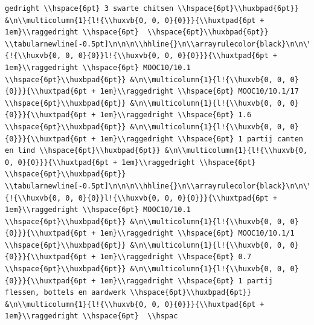 \documentclass[11pt,preprint, authoryear]{elsarticle}
\numberwithin{equation}{section}
\numberwithin{figure}{section}
\numberwithin{table}{section}
\begin{document}
\begin{verbatim}
gedright \\hspace{6pt} 3 swarte chitsen \\hspace{6pt}\\huxbpad{6pt}} &\n\\multicolumn{1}{l!{\\huxvb{0, 0, 0}{0}}}{\\huxtpad{6pt + 1em}\\raggedright \\hspace{6pt}  \\hspace{6pt}\\huxbpad{6pt}} \\tabularnewline[-0.5pt]\n\n\n\\hhline{}\n\\arrayrulecolor{black}\n\n\\multicolumn{1}{!{\\huxvb{0, 0, 0}{0}}l!{\\huxvb{0, 0, 0}{0}}}{\\huxtpad{6pt + 1em}\\raggedright \\hspace{6pt} MOOC10/10.1 \\hspace{6pt}\\huxbpad{6pt}} &\n\\multicolumn{1}{l!{\\huxvb{0, 0, 0}{0}}}{\\huxtpad{6pt + 1em}\\raggedright \\hspace{6pt} MOOC10/10.1/17 \\hspace{6pt}\\huxbpad{6pt}} &\n\\multicolumn{1}{l!{\\huxvb{0, 0, 0}{0}}}{\\huxtpad{6pt + 1em}\\raggedright \\hspace{6pt} 1.6 \\hspace{6pt}\\huxbpad{6pt}} &\n\\multicolumn{1}{l!{\\huxvb{0, 0, 0}{0}}}{\\huxtpad{6pt + 1em}\\raggedright \\hspace{6pt} 1 partij canten en lind \\hspace{6pt}\\huxbpad{6pt}} &\n\\multicolumn{1}{l!{\\huxvb{0, 0, 0}{0}}}{\\huxtpad{6pt + 1em}\\raggedright \\hspace{6pt}  \\hspace{6pt}\\huxbpad{6pt}} \\tabularnewline[-0.5pt]\n\n\n\\hhline{}\n\\arrayrulecolor{black}\n\n\\multicolumn{1}{!{\\huxvb{0, 0, 0}{0}}l!{\\huxvb{0, 0, 0}{0}}}{\\huxtpad{6pt + 1em}\\raggedright \\hspace{6pt} MOOC10/10.1 \\hspace{6pt}\\huxbpad{6pt}} &\n\\multicolumn{1}{l!{\\huxvb{0, 0, 0}{0}}}{\\huxtpad{6pt + 1em}\\raggedright \\hspace{6pt} MOOC10/10.1/1 \\hspace{6pt}\\huxbpad{6pt}} &\n\\multicolumn{1}{l!{\\huxvb{0, 0, 0}{0}}}{\\huxtpad{6pt + 1em}\\raggedright \\hspace{6pt} 0.7 \\hspace{6pt}\\huxbpad{6pt}} &\n\\multicolumn{1}{l!{\\huxvb{0, 0, 0}{0}}}{\\huxtpad{6pt + 1em}\\raggedright \\hspace{6pt} 1 partij flessen, bottels en aardwerk \\hspace{6pt}\\huxbpad{6pt}} &\n\\multicolumn{1}{l!{\\huxvb{0, 0, 0}{0}}}{\\huxtpad{6pt + 1em}\\raggedright \\hspace{6pt}  \\hspac
\end{verbatim}
\end{document}
